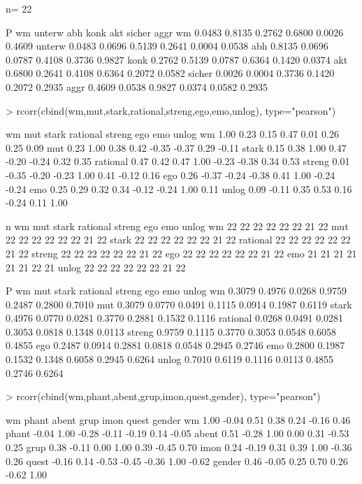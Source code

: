 \begin{Schunk}
\begin{Soutput}
n= 22 


P
       wm     unterw abh    konk   akt    sicher aggr  
wm            0.0483 0.8135 0.2762 0.6800 0.0026 0.4609
unterw 0.0483        0.0696 0.5139 0.2641 0.0004 0.0538
abh    0.8135 0.0696        0.0787 0.4108 0.3736 0.9827
konk   0.2762 0.5139 0.0787        0.6364 0.1420 0.0374
akt    0.6800 0.2641 0.4108 0.6364        0.2072 0.0582
sicher 0.0026 0.0004 0.3736 0.1420 0.2072        0.2935
aggr   0.4609 0.0538 0.9827 0.0374 0.0582 0.2935       
\end{Soutput}
\begin{Sinput}
> rcorr(cbind(wm,mut,stark,rational,streng,ego,emo,unlog), type="pearson")
\end{Sinput}
\begin{Soutput}
           wm   mut stark rational streng   ego   emo unlog
wm       1.00  0.23  0.15     0.47   0.01  0.26  0.25  0.09
mut      0.23  1.00  0.38     0.42  -0.35 -0.37  0.29 -0.11
stark    0.15  0.38  1.00     0.47  -0.20 -0.24  0.32  0.35
rational 0.47  0.42  0.47     1.00  -0.23 -0.38  0.34  0.53
streng   0.01 -0.35 -0.20    -0.23   1.00  0.41 -0.12  0.16
ego      0.26 -0.37 -0.24    -0.38   0.41  1.00 -0.24 -0.24
emo      0.25  0.29  0.32     0.34  -0.12 -0.24  1.00  0.11
unlog    0.09 -0.11  0.35     0.53   0.16 -0.24  0.11  1.00

n
         wm mut stark rational streng ego emo unlog
wm       22  22    22       22     22  22  21    22
mut      22  22    22       22     22  22  21    22
stark    22  22    22       22     22  22  21    22
rational 22  22    22       22     22  22  21    22
streng   22  22    22       22     22  22  21    22
ego      22  22    22       22     22  22  21    22
emo      21  21    21       21     21  21  22    21
unlog    22  22    22       22     22  22  21    22

P
         wm     mut    stark  rational streng ego    emo    unlog 
wm              0.3079 0.4976 0.0268   0.9759 0.2487 0.2800 0.7010
mut      0.3079        0.0770 0.0491   0.1115 0.0914 0.1987 0.6119
stark    0.4976 0.0770        0.0281   0.3770 0.2881 0.1532 0.1116
rational 0.0268 0.0491 0.0281          0.3053 0.0818 0.1348 0.0113
streng   0.9759 0.1115 0.3770 0.3053          0.0548 0.6058 0.4855
ego      0.2487 0.0914 0.2881 0.0818   0.0548        0.2945 0.2746
emo      0.2800 0.1987 0.1532 0.1348   0.6058 0.2945        0.6264
unlog    0.7010 0.6119 0.1116 0.0113   0.4855 0.2746 0.6264       
\end{Soutput}
\begin{Sinput}
> rcorr(cbind(wm,phant,abent,grup,imon,quest,gender), type="pearson")
\end{Sinput}
\begin{Soutput}
          wm phant abent  grup  imon quest gender
wm      1.00 -0.04  0.51  0.38  0.24 -0.16   0.46
phant  -0.04  1.00 -0.28 -0.11 -0.19  0.14  -0.05
abent   0.51 -0.28  1.00  0.00  0.31 -0.53   0.25
grup    0.38 -0.11  0.00  1.00  0.39 -0.45   0.70
imon    0.24 -0.19  0.31  0.39  1.00 -0.36   0.26
quest  -0.16  0.14 -0.53 -0.45 -0.36  1.00  -0.62
gender  0.46 -0.05  0.25  0.70  0.26 -0.62   1.00


\end{Soutput}
\end{Schunk}
